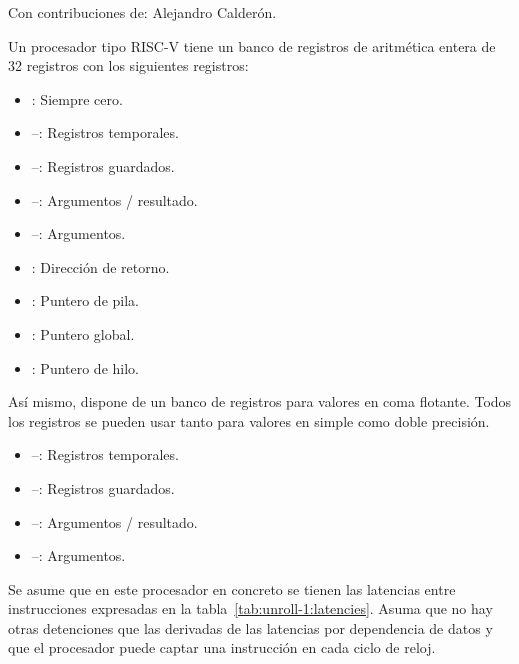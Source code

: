 \begin{acexercise}
Con contribuciones de: Alejandro Calderón.
\end{acexercise}

Un procesador tipo RISC-V tiene un banco de registros de aritmética entera 
de 32 registros con los siguientes registros:

\begin{itemize}
  \item {}: Siempre cero.
  \item {}--: Registros temporales.
  \item {}--: Registros guardados.
  \item {}--: Argumentos / resultado.
  \item {}--: Argumentos.
  \item {}: Dirección de retorno.
  \item {}: Puntero de pila.
  \item {}: Puntero global.
  \item {}: Puntero de hilo.
\end{itemize}

Así mismo, dispone de un banco de registros para valores en coma flotante. Todos los registros
se pueden usar tanto para valores en simple como doble precisión.

\begin{itemize}
  \item {}--: Registros temporales.
  \item {}--: Registros guardados.
  \item {}--: Argumentos / resultado.
  \item {}--: Argumentos.
\end{itemize}

Se asume que en este procesador en concreto se tienen las latencias entre instrucciones
expresadas en la tabla~\ref{tab:unroll-1:latencies}. Asuma que no hay otras detenciones
que las derivadas de las latencias por dependencia de datos y que el procesador puede
captar una instrucción en cada ciclo de reloj.

